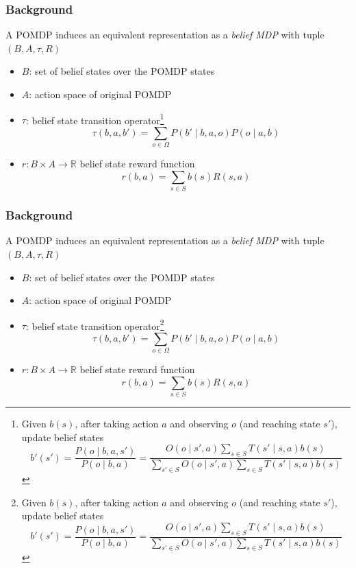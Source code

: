 \documentclass[10pt, compress]{beamer}
\begin{document}
\begin{frame}[fragile]
  \frametitle{Background}
  A POMDP induces an equivalent representation as a \emph{belief MDP} with tuple $(B, A, \tau, R)$

  \begin{itemize}
  \item $B$: set of belief states over the POMDP states
  \item $A$: action space of original POMDP
  \item $\tau$: belief state transition operator\footnote{
  Given $b(s)$, after taking action $a$ and observing $o$ (and reaching state
  $s'$), update belief states
  \begin{equation}
  b'(s') = \frac{P(o\mid b,a,s')}{P(o\mid b,a)}=\frac{O(o\mid s',a)\sum_{s\in S} T(s'\mid
  s,a)b(s)}{\sum_{s'\in S} O(o\mid s',a)\sum_{s\in S}T(s'\mid s,a)b(s)}
  \end{equation}
  }
  \begin{equation*}
  \tau(b, a, b')
  = \sum_{o\in\Omega} P(b'\mid b, a, o)P(o\mid a, b)
  \end{equation*}
  \item $r: B\times A \rightarrow \mathbb{R}$ belief state reward function
  \begin{equation*}
  r(b,a) = \sum_{s\in S}b(s)R(s,a)
  \end{equation*}
  \end{itemize}

\end{frame}

\begin{frame}[fragile]
  \frametitle{Background}
  A POMDP induces an equivalent representation as a \emph{belief MDP} with tuple $(B, A, \tau, R)$

  \begin{itemize}
  \item $B$: set of belief states over the POMDP states
  \item $A$: action space of original POMDP
  \item $\tau$: belief state transition operator\footnote{
  \alert{
  Given $b(s)$, after taking action $a$ and observing $o$ (and reaching state
  $s'$), update belief states
  \begin{equation}
  b'(s') = \frac{P(o\mid b,a,s')}{P(o\mid b,a)}=\frac{O(o\mid s',a)\sum_{s\in S} T(s'\mid
  s,a)b(s)}{\sum_{s'\in S} O(o\mid s',a)\sum_{s\in S}T(s'\mid s,a)b(s)}
  \end{equation}
  }}
  \begin{equation*}
  \tau(b, a, b')
  = \sum_{o\in\Omega} P(b'\mid b, a, o)P(o\mid a, b)
  \end{equation*}
  \item $r: B\times A \rightarrow \mathbb{R}$ belief state reward function
  \begin{equation*}
  r(b,a) = \sum_{s\in S}b(s)R(s,a)
  \end{equation*}
  \end{itemize}

\end{frame}
\end{document}
